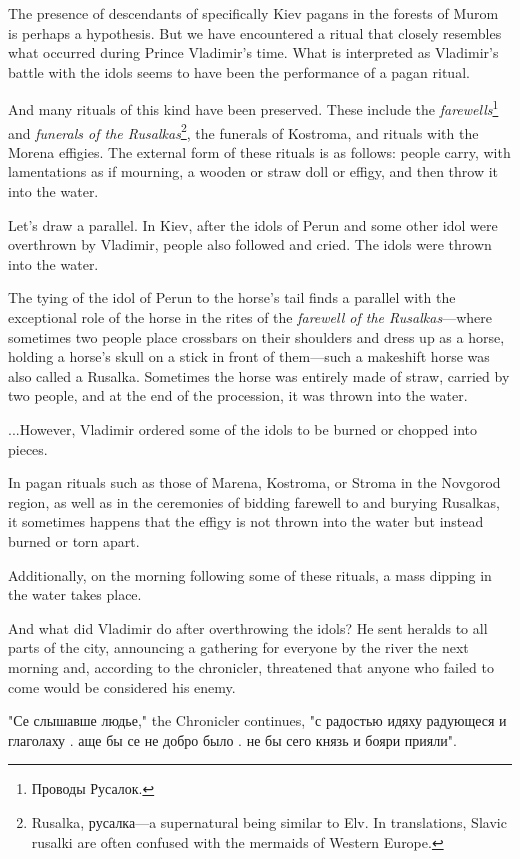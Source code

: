\documentclass[a5paper,11pt,openany]{article}
\begin{document}
The presence of descendants of specifically Kiev pagans in the forests of Murom is perhaps a hypothesis. But we have encountered a ritual that closely resembles what occurred during Prince Vladimir's time. What is interpreted as Vladimir's battle with the idols seems to have been the performance of a pagan ritual.   

And many rituals of this kind have been preserved. These include the \textit{farewells}\footnote{Проводы Русалок.} and \textit{funerals of the Rusal\-kas}\footnote{Rusalka, русалка—a supernatural being similar to Elv. In translations, Slavic rusalki are often confused with the mermaids of Western Europe.}, the funerals of Kostroma, and rituals with the Morena effigies. The external form of these rituals is as follows: people carry, with lamentations as if mourning, a wooden or straw doll or effigy, and then throw it into the water.

Let's draw a parallel. In Kiev, after the idols of Perun and some other idol were overthrown by Vladimir, people also followed and cried. The idols were thrown into the water.

The tying of the idol of Perun to the horse’s tail finds a parallel with the exceptional role of the horse in the rites of the \textit{farewell of the Rusalkas}—where sometimes two people place crossbars on their shoulders and dress up as a horse, holding a horse’s skull on a stick in front of them—such a makeshift horse was also called a Rusalka. Sometimes the horse was entirely made of straw, carried by two people, and at the end of the procession, it was thrown into the water.

...However, Vladimir ordered some of the idols to be burned or chopped into pieces.

In pagan rituals such as those of Marena, Kostroma, or Stroma in the Novgorod region, as well as in the ceremonies of bidding farewell to and burying Rusalkas, it sometimes happens that the effigy is not thrown into the water but instead burned or torn apart.

Additionally, on the morning following some of these rituals, a mass dipping in the water takes place.

And what did Vladimir do after overthrowing the idols? He sent heralds to all parts of the city, announcing a gathering for everyone by the river the next morning and, according to the chronicler, threatened that anyone who failed to come would be considered his enemy.

"Се слышавше людье," the Chronicler continues, "с радостью идяху радующеся и глаголаху . аще бы се не добро было . не бы сего князь и бояри прияли".
\end{document}
